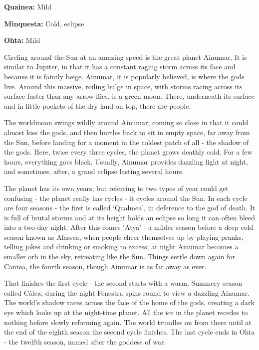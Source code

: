 \begin{multicols}{2}
\begin{tcolorbox}
\begin{list}{\addtocounter{enc}{1} \bf Cycle }{}
\begin{list}{\addtocounter{list}{1}}{}
\item \textbf{Quainea:}  Mild

\item \textbf{Minquesta:}  Cold, eclipse

\item \textbf{Ohta:}  Mild

\end{list}

\end{list}

\end{tcolorbox}

Circling around the Sun at an amazing speed is the great planet Ainumar.  It is similar to Jupiter, in that it has a constant raging storm across its face and because it is faintly beige.  Ainumar, it is popularly believed, is where the gods live.  Around this massive, roiling bulge in space, with storms racing across its surface faster than any arrow flies, is a green moon.  There, underneath its surface and in little pockets of the dry land on top, there are people.

	The worldmoon swings wildly around Ainumar, coming so close in that it could almost kiss the gods, and then hurtles back to sit in empty space, far away from the Sun, before landing for a moment in the coldest patch of all - the shadow of the gods.  Here, twice every three cycles, the planet grows deathly cold.  For a few hours, everything goes black.  Usually, Ainumar provides dazzling light at night, and sometimes, after, a grand eclipse lasting several hours.

	The planet has its own years, but referring to two types of year could get confusing - the planet really has cycles - it cycles around the Sun.  In each cycle are four seasons - the first is called `Qualmea', in deference to the god of death.  It is full of brutal storms and at its height holds an eclipse so long it can often bleed into a two-day night.  After this comes `Atya' - a milder season before a deep cold season known as Alassea, when people cheer themselves up by playing pranks, telling jokes and drinking or smoking to excess; at night Ainumar becomes a smaller orb in the sky, retreating like the Sun.  Things settle down again for Cantea, the fourth season, though Ainumar is as far away as ever.

That finishes the first cycle - the second starts with a warm, Summery season called C\'{a}lea; during the night Fenestra spins round to view a dazzling Ainumar.  The world's shadow races across the face of the home of the gods, creating a dark eye which looks up at the night-time planet.  All the ice in the planet recedes to nothing before slowly reforming again.  The world trundles on from there until at the end of the eighth season the second cycle finishes.  The last cycle ends in Ohta - the twelfth season, named after the goddess of war.

\end{multicols}

